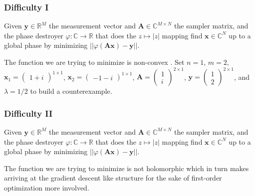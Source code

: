 \begin{frame}
    \frametitle{Difficulty I}
    \pause
    \begin{Pro}\label{pro:phase_retrieval_simple}
        Given $\boldsymbol{y} \in \mathbb{R}^M$ the measurement vector and $\boldsymbol{A} \in \mathbb{C}^{M \times N}$ the sampler matrix, 
        and the phase destroyer $\varphi \colon \mathbb{C} \to \mathbb{R}$ that does the
         $z \mapsto \left|z\right|$ mapping find $\boldsymbol{x} \in \mathbb{C}^N$ up to a global phase 
        by minimizing $ \left|\left|\varphi(\boldsymbol{A}\boldsymbol{x})-\boldsymbol{y}\right|\right|$.
      \end{Pro}
    \pause
      \begin{Rem}
    The function we are trying to minimize is non-convex \cite{Candes2014}. Set $n=1$, $m=2$, $\boldsymbol{x}_1 = \begin{pmatrix}1+i\end{pmatrix}^{1 \times 1}$, 
    $\boldsymbol{x}_2 = \begin{pmatrix}-1-i\end{pmatrix}^{1 \times 1}$, $\boldsymbol{A}=\begin{pmatrix}1\\i \end{pmatrix}^{2 \times 1}$, 
    $\boldsymbol{y}=\begin{pmatrix}1\\2 \end{pmatrix}^{2 \times 1}$, and $\lambda=1/2$ to build a counterexample.
      \end{Rem}
\end{frame}

\begin{frame}
    \frametitle{Difficulty II}
    \begin{Pro}
        Given $\boldsymbol{y} \in \mathbb{R}^M$ the measurement vector and $\boldsymbol{A} \in \mathbb{C}^{M \times N}$ the sampler matrix, 
        and the phase destroyer $\varphi \colon \mathbb{C} \to \mathbb{R}$ that does the
         $z \mapsto \left|z\right|$ mapping find $\boldsymbol{x} \in \mathbb{C}^N$ up to a global phase 
        by minimizing $ \left|\left|\varphi(\boldsymbol{A}\boldsymbol{x})-\boldsymbol{y}\right|\right|$.
      \end{Pro}
    \pause
      \begin{Rem}
        The function we are trying to minimize is not holomorphic which in turn makes arriving at the 
        gradient descent like structure for the sake of first-order optimization more involved.
      \end{Rem}
\end{frame}






